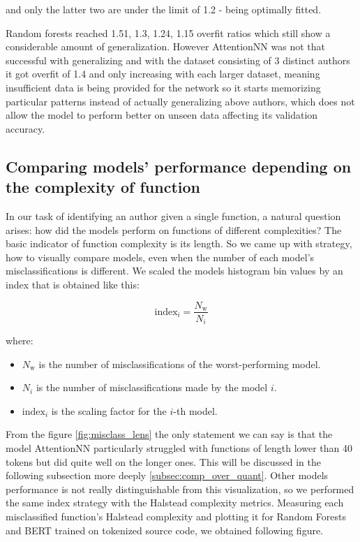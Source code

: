 \documentclass[conference]{IEEEtran}
\begin{document}
and only the latter two are under the limit of 1.2 - being optimally fitted. 

Random forests reached 1.51, 1.3, 1.24, 1.15 overfit ratios which still show a considerable amount of generalization. However AttentionNN was not that successful with generalizing 
and with the dataset consisting of 3 distinct authors it got overfit of 1.4 and only increasing with each larger dataset, meaning insufficient data is being provided for the network so it starts memorizing particular 
patterns instead of actually generalizing above authors, which does not allow the model to perform better on unseen data affecting its validation accuracy.

\subsection{Comparing models' performance depending on the complexity of function}

In our task of identifying an author given a single function, a natural question arises: how did the models 
perform on functions of different complexities? The basic indicator of function complexity is its length. So we came up with strategy, 
how to visually compare models, even when the number of each model's misclassifications is different. We scaled the models histogram bin values by 
an index that is obtained like this: 

\begin{equation}
    \text{index}_{i} = \frac{N_{\text{w}}}{N_{i}}
\end{equation}

\noindent where:
\begin{itemize}
    \item $N_{\text{w}}$ is the number of misclassifications of the worst-performing model.
    \item $N_{i}$ is the number of misclassifications made by the model \( i \).
    \item $\text{index}_{i}$ is the scaling factor for the $i$-th model.
\end{itemize}

From the figure \ref{fig:misclass_lens} the only statement we can say is that the model AttentionNN particularly struggled with functions of length lower than 40 tokens
but did quite well on the longer ones. This will be discussed in the following subsection more deeply \ref{subsec:comp_over_quant}.
Other models performance is not really distinguishable from this visualization, so we performed the same index strategy with the Halstead complexity metrics.
Measuring each misclassified function's Halstead complexity and plotting it for Random Forests and BERT trained on tokenized source code, we obtained following figure.
\end{document}

